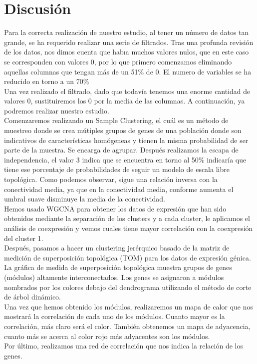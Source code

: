 
\newpage

\section{Discusión}

\noindent Para la correcta realización de nuestro estudio, al tener un número de datos tan grande, se ha requerido realizar una serie de filtrados. Tras una profunda revisión de los datos, nos dimos cuenta que habıa muchos valores nulos, que en este caso se corresponden con valores 0, por lo que primero comenzamos eliminando aquellas columnas que tengan más de un 51\% de 0. El numero de variables se ha reducido en torno a un 70\%
 \\

\noindent Una vez realizado el filtrado, dado que todavía tenemos una enorme cantidad de valores 0, sustituiremos los 0 por la media de las columnas. A continuación, ya podremos realizar nuestro estudio.
 \\

\noindent Comenzaremos realizando un Sample Clustering, el cuál es un método de muestreo donde se crea mútiples grupos de genes de una población donde son indicativos de características homógeneas y tienen la misma probabilidad de ser parte de la muestra. Se encarga de agrupar. Después realizamos la escapa de independencia, el valor 3 indica que se encuentra en torno al 50\% indicaría que tiene ese porcentaje de probabilidades de seguir un modelo de escala libre topológica. Como podemos observar, sigue una relación inversa con la conectividad media, ya que en la conectividad media, conforme aumenta el umbral suave disminuye la media de la conectividad.
\\

\noindent Hemos usado WGCNA para obtener los datos de expresión que han sido obtenidos mediante la separación de los clusters y a cada cluster, le aplicamos el análisis de coexpresión y vemos cuales tiene mayor correlación con la coexpresión del cluster 1.
 \\

\noindent Después, pasamos a hacer un clustering jerérquico basado de la matriz de medición de superposición topológica (TOM) para los datos de expresión génica. La gráfica de medida de superposición topológica muestra grupos de genes (módulos) altamente interconectados. Los genes se asignaron a módulos nombrados por los colores debajo del dendrograma utilizando el método de corte de árbol dinámico.
 \\

\noindent Una vez que hemos obtenido los módulos, realizaremos un mapa de calor que nos mostrará la correlación de cada uno de los módulos. Cuanto mayor es la correlación, más claro será el color. También obtenemos un mapa de adyacencia, cuanto más se acerca al color rojo más adyacentes son los módulos.
 \\

\noindent Por último, realizamos una red de correlación que nos indica la relación de los genes.